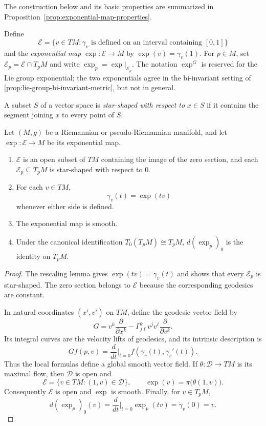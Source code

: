 The construction below and its basic properties are summarized in
Proposition~\ref{prop:exponential-map-properties}.

Define
\[
\mathcal E=\{v\in TM:\gamma_v\text{ is defined on an interval containing }[0,1]\}
\]
and the \emph{exponential map} $\exp:\mathcal E\to M$ by
$\exp(v)=\gamma_v(1)$.  For $p\in M$, set
$\mathcal E_p=\mathcal E\cap T_pM$ and write
$\exp_p=\exp|_{\mathcal E_p}$.  The notation $\exp^G$ is reserved for the Lie
group exponential; the two exponentials agree in the bi-invariant setting of
\cref{prop:lie-group-bi-invariant-metric}, but not in general.

A subset $S$ of a vector space is \emph{star-shaped with respect to} $x\in S$
if it contains the segment joining $x$ to every point of $S$.

\begin{proposition}
\label{prop:exponential-map-properties}

Let $(M, g)$ be a Riemannian or pseudo-Riemannian manifold, and let
$\exp: \mathcal{E} \to M$ be its exponential map.
\begin{enumerate}[label=(\alph*)]
\item $\mathcal{E}$ is an open subset of $TM$ containing the image of the zero
section, and each $\mathcal{E}_p \subseteq T_p M$ is star-shaped with respect
to $0$.
\item For each $v \in TM$,
\begin{equation}
\gamma_v(t) = \exp(tv) \tag{5.17}
\end{equation}
whenever either side is defined.
\item The exponential map is smooth.
\item Under the canonical identification $T_0(T_pM)\cong T_pM$,
$d(\exp_p)_0$ is the identity on $T_pM$.
\end{enumerate}

\begin{proof}
\sketch
The rescaling lemma gives $\exp(tv)=\gamma_v(t)$ and shows that every
$\mathcal E_p$ is star-shaped.  The zero section belongs to $\mathcal E$
because the corresponding geodesics are constant.

In natural coordinates $(x^i,v^i)$ on $TM$, define the geodesic vector field
by
\[
G=v^k\frac{\partial}{\partial x^k}
-\Gamma^k_{j\ell}v^jv^\ell\frac{\partial}{\partial v^k}.
\]
Its integral curves are the velocity lifts of geodesics, and its intrinsic
description is
\begin{equation}
Gf(p,v) = \frac{d}{dt}\bigg|_{t=0}
f(\gamma_v(t), \gamma_v'(t)). \tag{5.18}
\end{equation}
Thus the local formulas define a global smooth vector field.  If
$\theta:\mathcal D\to TM$ is its maximal flow, then $\mathcal D$ is open and
\[
\mathcal E=\{v\in TM:(1,v)\in\mathcal D\},
\qquad
\exp(v)=\pi\bigl(\theta(1,v)\bigr).
\]
Consequently $\mathcal E$ is open and $\exp$ is smooth.  Finally, for
$v\in T_pM$,
\[
d(\exp_p)_0(v)
=\frac{d}{dt}\bigg|_{t=0}\exp_p(tv)
=\dot\gamma_v(0)=v.
\]
\end{proof}
\end{proposition}

